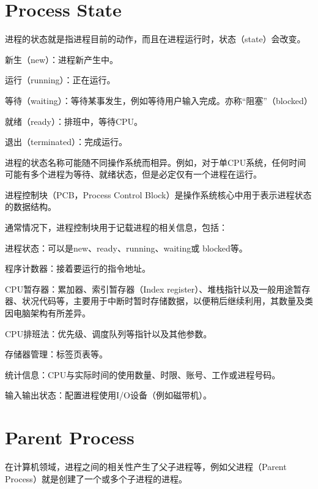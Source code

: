 \section{Process State}


进程的状态就是指进程目前的动作，而且在进程运行时，状态（state）会改变。

\begin{compactitem}
\item 新生（new）：进程新产生中。
\item 运行（running）：正在运行。
\item 等待（waiting）：等待某事发生，例如等待用户输入完成。亦称“阻塞”（blocked）
\item 就绪（ready）：排班中，等待CPU。
\item 退出（terminated）：完成运行。
\end{compactitem}

进程的状态名称可能随不同操作系统而相异。例如，对于单CPU系统，任何时间可能有多个进程为等待、就绪状态，但是必定仅有一个进程在运行。

进程控制块（PCB，Process Control Block）是操作系统核心中用于表示进程状态的数据结构。

通常情况下，进程控制块用于记载进程的相关信息，包括：

\begin{compactitem}
\item 进程状态：可以是new、ready、running、waiting或 blocked等。
\item 程序计数器：接着要运行的指令地址。
\item CPU暂存器：累加器、索引暂存器（Index register）、堆栈指针以及一般用途暂存器、状况代码等，主要用于中断时暂时存储数据，以便稍后继续利用，其数量及类因电脑架构有所差异。
\item CPU排班法：优先级、调度队列等指针以及其他参数。
\item 存储器管理：标签页表等。
\item 统计信息：CPU与实际时间的使用数量、时限、账号、工作或进程号码。
\item 输入输出状态：配置进程使用I/O设备（例如磁带机）。
\end{compactitem}



\section{Parent Process}

在计算机领域，进程之间的相关性产生了父子进程等，例如父进程（Parent Process）就是创建了一个或多个子进程的进程。


